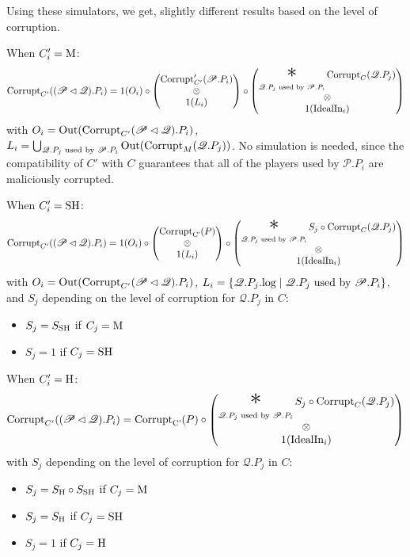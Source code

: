 \begin{theorem}
Using these simulators, we get, slightly different results based
on the level of corruption.

When $C'_i = \text{M}$:
$$
\tx{Corrupt}_{C'}((\mathscr{P} \lhd \mathscr{Q}).P_i) =
1(O_i) \circ
\begin{pmatrix}
  \tx{Corrupt}'_{C'}(\mathscr{P}.P_i)\cr
  \otimes\cr
  1(L_i)\cr
\end{pmatrix}
\circ
\begin{pmatrix}
\displaystyle \bigast_{\mathscr{Q}.P_j \tx{ used by } \mathscr{P}.P_i}
  \tx{Corrupt}_C(\mathscr{Q}.P_j)\cr
\otimes\cr
1(\tx{IdealIn}_i)
\end{pmatrix}
$$
with $O_i = \text{Out}(\text{Corrupt}_{C'}(\mathscr{P} \lhd \mathscr{Q}).P_i)$, $L_i= \bigcup_{\mathscr{Q}.P_j \text{ used by } \mathscr{P}.P_i} \text{Out}(\text{Corrupt}_M(\mathscr{Q}.P_j))$.
No simulation is needed, since the compatibility of $C'$ with $C$
guarantees that all of the players used by $\mathscr{P}.P_i$
are maliciously corrupted.

When $C'_i = \text{SH}$:
$$
\tx{Corrupt}_{C'}((\mathscr{P} \lhd \mathscr{Q}).P_i) =
1(O_i) \circ
\begin{pmatrix}
  \tx{Corrupt}_{\tx{C'}}(P)\cr
  \otimes\cr
  1(L_i)
\end{pmatrix}
\circ
\begin{pmatrix}
\displaystyle \bigast_{\mathscr{Q}.P_j \tx{ used by } \mathscr{P}.P_i}
  S_j \circ \tx{Corrupt}_C(\mathscr{Q}.P_j)\cr
  \otimes\cr
1(\tx{IdealIn}_i)
\end{pmatrix}
$$
with $O_i = \text{Out}(\text{Corrupt}_{C'}(\mathscr{P} \lhd \mathscr{Q}).P_i)$,
$L_i = \{\mathscr{Q}.P_j.\text{log} \mid \mathscr{Q}.P_j \text{ used by } \mathscr{P}.P_i \}$,
and $S_j$ depending on the level of corruption for $\mathscr{Q}.P_j$ in $C$:
\begin{itemize}
  \item $S_j = S_{\text{SH}}$ if $C_j = \text{M}$
  \item $S_j = 1$ if $C_j = \text{SH}$
\end{itemize}

When $C'_i = \text{H}$:
$$
\tx{Corrupt}_{C'}((\mathscr{P} \lhd \mathscr{Q}).P_i) =
  \tx{Corrupt}_{\tx{C'}}(P)
\circ
\begin{pmatrix}
\displaystyle \bigast_{\mathscr{Q}.P_j \tx{ used by } \mathscr{P}.P_i}
  S_j \circ \tx{Corrupt}_C(\mathscr{Q}.P_j)\cr
\otimes\cr
1(\tx{IdealIn}_i)
\end{pmatrix}
$$
with $S_j$ depending on the level of corruption for $\mathscr{Q}.P_j$ in $C$:
\begin{itemize}
  \item $S_j = S_{\text{H}} \circ S_{\text{SH}}$ if $C_j = \text{M}$
  \item $S_j = S_{\text{H}}$ if $C_j = \text{SH}$
  \item $S_j = 1$ if $C_j = \text{H}$
\end{itemize}


\end{theorem}
